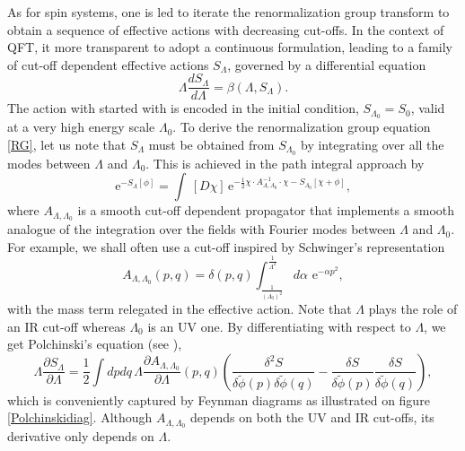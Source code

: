 \documentclass[10pt,here,feynmf]{article}
\begin{document}
As for spin systems, one is led to iterate the renormalization group transform to obtain a sequence of effective actions with decreasing cut-offs. In the context of QFT, it more transparent to adopt a continuous formulation, leading to a family of cut-off dependent effective actions $S_{\Lambda}$, governed by a differential equation     
\begin{equation}
\Lambda\frac{dS_{\Lambda}}{d\Lambda}=\beta(\Lambda,S_{\Lambda}).
\label{RG}
\end{equation}
The action with started with is encoded in the initial condition, $S_{\Lambda_{0}}=S_{0}$, valid at a very high energy scale $\Lambda_{0}$. To derive the renormalization group equation \eqref{RG}, let us note that $S_{\Lambda}$ must be obtained from $S_{\Lambda_{0}}$ by integrating over all the modes between $\Lambda$ and $\Lambda_{0}$. This is achieved in the path integral approach by
\begin{equation}  
\mbox{e}^{-S_{\Lambda}[\phi]}= \int\, [D\chi]\,\mathrm{e}^{-{\textstyle\frac{1}{2}}\chi\cdot A^{-1}_{\Lambda,\Lambda_{0}}\cdot\chi-S_{\Lambda_0}[\chi+\phi]},
\end{equation}
where $A_{\Lambda,\Lambda_{0}}$ is a smooth cut-off dependent propagator that implements a smooth analogue of the integration over the fields with Fourier modes between $\Lambda$ and $\Lambda_{0}$. For example, we shall often use a cut-off inspired by Schwinger's representation
\begin{equation}
{A_{\Lambda,\Lambda_{0}}}(p,q)=\delta(p,q)\int^{\frac{1}{\Lambda^{2}}}_{\frac{1}{(\Lambda_{0})^{2}}}\!\!d\alpha\,\,
\mathrm{e}^{-\alpha p^{2}},
\end{equation}
with the mass term relegated in the effective action. Note that $\Lambda$ plays the role of an IR cut-off whereas $\Lambda_{0}$ is an UV one. By differentiating with respect to $\Lambda$, we get Polchinski's equation (see \cite{Polchinski}), 
\begin{equation}
\Lambda\frac{\partial
S_{\Lambda}}{\partial\Lambda}=\frac{1}{2}\int\!dp dq\,
\Lambda\frac{\partial
A_{\Lambda,\Lambda_{0}}}{\partial\Lambda}(p,q)\left(
\frac{\delta^{2}S}{\delta\widetilde{\phi}(p)\delta\widetilde{\phi}(q)}- \frac{\delta
S}{\delta\widetilde{\phi}(p)} \frac{\delta S}{\delta\widetilde{\phi}(q)} \right),
\label{erge}
\end{equation}
which is conveniently captured by Feynman diagrams as illustrated on figure \ref{Polchinskidiag}. Although $A_{\Lambda,\Lambda_{0}}$ depends on both the UV and IR cut-offs,  its derivative only depends on $\Lambda$. 
\end{document}
